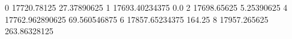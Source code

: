 0 17720.78125 27.37890625
1 17693.40234375 0.0
2 17698.65625 5.25390625
4 17762.962890625 69.560546875
6 17857.65234375 164.25
8 17957.265625 263.86328125
